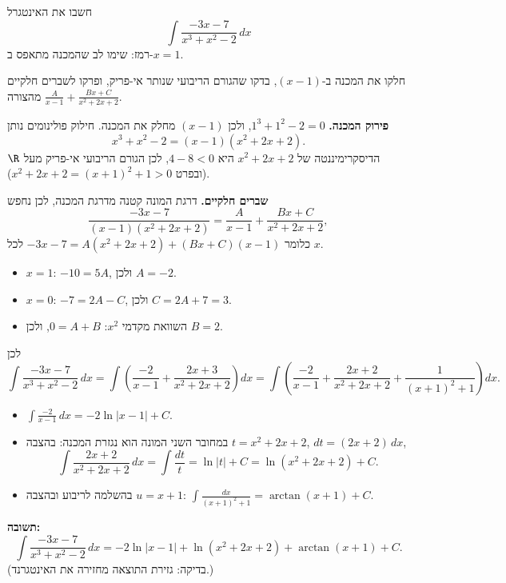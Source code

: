
\begin{question}
חשבו את האינטגרל
\[ \int \frac{-3x - 7}{x^3 + x^2 - 2}\,dx \]
רמז: שימו לב שהמכנה מתאפס ב-$x = 1$.
\end{question}

\begin{hint}
חלקו את המכנה ב-$(x - 1)$, בדקו שהגורם הריבועי שנותר אי-פריק, ופרקו לשברים חלקיים מהצורה $\frac{A}{x-1} + \frac{Bx + C}{x^2 + 2x + 2}$.
\end{hint}

\begin{solution}
\textbf{פירוק המכנה.} $1^3 + 1^2 - 2 = 0$, ולכן $(x - 1)$ מחלק את המכנה. חילוק פולינומים נותן
\[ x^3 + x^2 - 2 = (x - 1)(x^2 + 2x + 2). \]
הדיסקרימיננטה של $x^2 + 2x + 2$ היא $4 - 8 < 0$, לכן הגורם הריבועי אי-פריק מעל $\R$ (ובפרט $x^2 + 2x + 2 = (x+1)^2 + 1 > 0$).

\textbf{שברים חלקיים.} דרגת המונה קטנה מדרגת המכנה, לכן נחפש
\[ \frac{-3x - 7}{(x - 1)(x^2 + 2x + 2)} = \frac{A}{x - 1} + \frac{Bx + C}{x^2 + 2x + 2}, \]
כלומר $-3x - 7 = A(x^2 + 2x + 2) + (Bx + C)(x - 1)$ לכל $x$.
\begin{itemize}
  \item $x = 1$: $-10 = 5A$, ולכן $A = -2$.
  \item $x = 0$: $-7 = 2A - C$, ולכן $C = 2A + 7 = 3$.
  \item השוואת מקדמי $x^2$: $0 = A + B$, ולכן $B = 2$.
\end{itemize}
לכן
\[ \int \frac{-3x - 7}{x^3 + x^2 - 2}\,dx = \int \left( \frac{-2}{x - 1} + \frac{2x + 3}{x^2 + 2x + 2} \right) dx
   = \int \left( \frac{-2}{x - 1} + \frac{2x + 2}{x^2 + 2x + 2} + \frac{1}{(x + 1)^2 + 1} \right) dx. \]
\begin{itemize}
  \item $\int \frac{-2}{x - 1}\,dx = -2\ln|x - 1| + C$.
  \item במחובר השני המונה הוא נגזרת המכנה: בהצבה $t = x^2 + 2x + 2$, $dt = (2x + 2)\,dx$,
  \[ \int \frac{2x + 2}{x^2 + 2x + 2}\,dx = \int \frac{dt}{t} = \ln|t| + C = \ln(x^2 + 2x + 2) + C. \]
  \item בהשלמה לריבוע ובהצבה $u = x + 1$: $\int \frac{dx}{(x + 1)^2 + 1} = \arctan(x + 1) + C$.
\end{itemize}
\textbf{תשובה:}
\[ \boxed{\int \frac{-3x - 7}{x^3 + x^2 - 2}\,dx = -2\ln|x - 1| + \ln(x^2 + 2x + 2) + \arctan(x + 1) + C.} \]
(בדיקה: גזירת התוצאה מחזירה את האינטגרנד.)
\end{solution}
